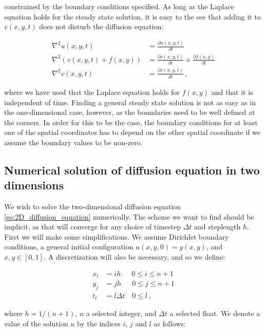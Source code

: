 \documentclass[reprint,english,notitlepage]{revtex4-1}  %
\begin{document}
constrained by the boundary conditions specified. As long as the Laplace equation holds for the steady state solution, it is easy to the see that adding it to $v(x,y,t)$ does not disturb the diffusion equation:

\begin{align*}
\nabla^2 u(x,y,t) &= \frac{\partial u(x,y,t)}{\partial t} \\
\nabla^2 (v(x,y,t) + f(x,y) ) &= \frac{\partial v(x,y,t)}{\partial t} + \frac{\partial f(x,y)}{\partial t} \\
\nabla^2 v(x,y,t) &= \frac{\partial v(x,y,t)}{\partial t} \, ,
\end{align*}

where we have used that the Laplace equation holds for $f(x,y)$ and that it is independent of time. Finding a general steady state solution is not as easy as in the one-dimensional case, however, as the boundaries need to be well defined at the corners. In order for this to be the case, the boundary conditions for at least one of the spatial coordinates has to depend on the other spatial coordinate if we assume the boundary values to be non-zero. 





\subsection{Numerical solution of diffusion equation in two dimensions} \label{sec:formalism_2D_diff_eq_numerical}

We wish to solve the two-dimensional diffusion equation \eqref{eq:2D_diffusion_equation} numerically. The scheme we want to find should be implicit, as that will converge for any choice of timestep $\Delta t$ and steplength $h$. First we will make some simplifications. We assume Dirichlet boundary conditions, a general initial configuration $u(x,y,0) = g(x,y)$, and $x,y\in[0,1]$. A discretization will also be necessary, and so we define:

\begin{align*}
x_i &= i h \,\,\,\quad 0 \leq i \leq n+1 \\
y_j &= j h \,\,\,\quad 0 \leq j \leq n+1 \\
t_l &= l \Delta t \quad 0 \leq l \, ,
\end{align*}

where $h = 1/(n+1)$, $n$ a selected integer, and $\Delta t$ a selected float. We denote a value of the solution $u$ by the indices $i$, $j$ and $l$ as follows:
\end{document}
